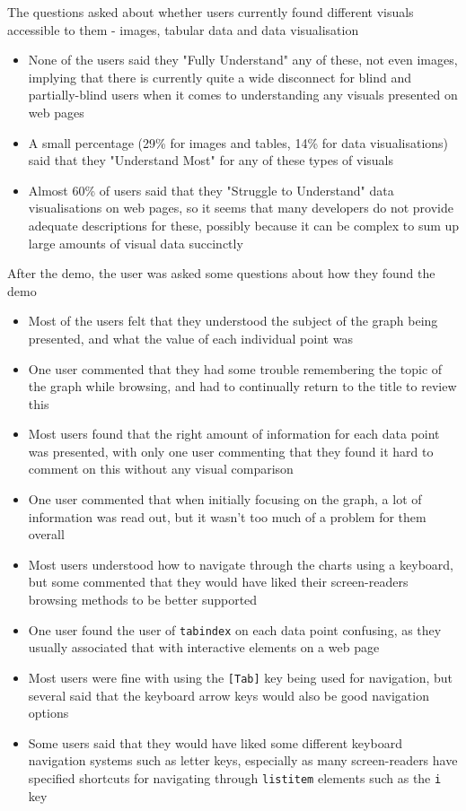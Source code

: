 \documentclass[ %
                    author={Aleena Baig},
                supervisor={Dr Simon Lock},
                    degree={BSc},
                     title={On Making Web Accessible Graphs},
                  subtitle={},
                      year={2019} ]{dissertation}
\begin{document}
The questions asked about whether users currently found different visuals accessible to them - images, tabular data and data visualisation

\begin{itemize}
    \item None of the users said they "Fully Understand" any of these, not even images, implying that there is currently quite a wide disconnect for blind and partially-blind users when it comes to understanding any visuals presented on web pages
    \item A small percentage (29\% for images and tables, 14\% for data visualisations) said that they "Understand Most" for any of these types of visuals
    \item Almost 60\% of users said that they "Struggle to Understand" data visualisations on web pages, so it seems that many developers do not provide adequate descriptions for these, possibly because it can be complex to sum up large amounts of visual data succinctly
\end{itemize}

After the demo, the user was asked some questions about how they found the demo

\begin{itemize}
    \item Most of the users felt that they understood the subject of the graph being presented, and what the value of each individual point was
    \item One user commented that they had some trouble remembering the topic of the graph while browsing, and had to continually return to the title to review this
    \item Most users found that the right amount of information for each data point was presented, with only one user commenting that they found it hard to comment on this without any visual comparison
    \item One user commented that when initially focusing on the graph, a lot of information was read out, but it wasn't too much of a problem for them overall
    \item Most users understood how to navigate through the charts using a keyboard, but some commented that they would have liked their screen-readers browsing methods to be better supported
    \item One user found the user of \texttt{tabindex} on each data point confusing, as they usually associated that with interactive elements on a web page
    \item Most users were fine with using the \texttt{[Tab]} key being used for navigation, but several said that the keyboard arrow keys would also be good navigation options
    \item Some users said that they would have liked some different keyboard navigation systems such as letter keys, especially as many screen-readers have specified shortcuts for navigating through \texttt{listitem} elements such as the \texttt{i} key
\end{itemize}
\end{document}
